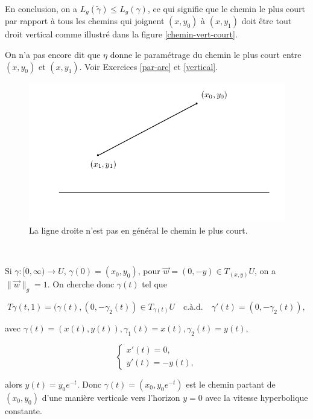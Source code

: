 \documentclass[french]{article}
\theoremstyle{definition}
\begin{document}

En conclusion, on a \(L_g(\tilde{\gamma}) \leq L_g(\gamma)\), ce qui signifie que le chemin le plus court par rapport à tous les chemins qui joignent \((x,y_0)\) à \((x,y_1)\) doit \^etre tout droit vertical comme illustré dans la figure \ref{chemin-vert-court}.

{\selectfont{}\relax} On n'a pas encore dit que \(\eta\) donne le param\'etrage du chemin le plus court entre \((x,y_0)\) et \((x,y_1)\).   Voir Exercices \ref{par-arc} et \ref{vertical}.


\begin{figure}[h!]
  \centering
  \includegraphics[scale=0.3]{figures/ligne-pas-tres-courte.png}
  \caption{La ligne droite n'est pas en général le chemin le plus court.}
  \label{}
\end{figure}

\


Si \(\gamma : [0, \infty) \longrightarrow U\),   \(\gamma(0) = (x_0, y_0)\), pour  \(\vec{w} =(0, -y) \in T _{(x,y)} U\), on a $\|\vec w\|_g =1$. On cherche donc \(\gamma(t)\) tel que

  \[ T\gamma (t,	1) = (\gamma(t), (0,-\gamma_2(t))  \in T_{\gamma(t)} U \quad  \text{c.\`a.d.} \quad \gamma'(t) =(0, -\gamma_2(t)),\]

avec \(\gamma(t) = (x(t), y(t)), \gamma_1(t) = x(t), \gamma_2(t) = y(t)\),

\[\begin{cases}
  x'(t) =0,   \\
  y'(t)=- y(t),
\end{cases}\]

alors \(y(t) = y_0 e^{-t} \). Donc \(\gamma(t) = (x_0, y_0 e^{-t})\) est le chemin partant de \((x_0, y_0)\) d'une manière verticale vers l'horizon \(y=0\) avec la vitesse hyperbolique constante.
\end{document}
